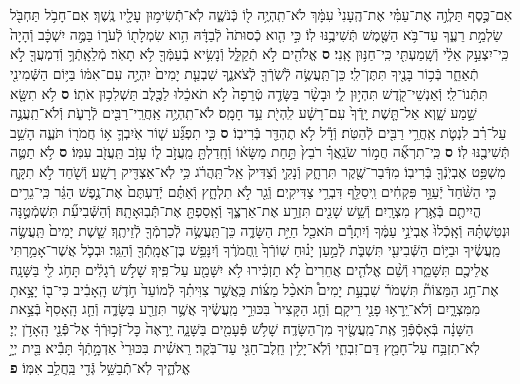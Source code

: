 \documentclass[twoside, openany, parskip=half, 11pt]{book}
\begin{document}
\begin{sometimes}
\begin{footnotesize}
\begin{multicols}{2}
\\
\\
אִם־כֶּ֣סֶף תַּלְוֶ֣ה אֶת־עַמִּ֗י אֶת־הֶֽעָנִי֙ עִמָּ֔ךְ לֹא־תִֽהְיֶ֥ה ל֖וֹ כְּֿנֹשֶׁ֑ה לֹֽא־תְֿֿשִׂימ֥וּן עָלָ֖יו נֶֽשֶׁךְ׃ אִם־חָבֹ֥ל תַּחְבֹּ֖ל שַׂלְמַ֣ת רֵעֶ֑ךָ עַד־בֹּ֥א הַשֶּׁ֖מֶשׁ תְּֿשִׁיבֶ֥נּוּ לֽוֹ׃ כִּ֣י הִ֤וא כְֿסוּתֹה֙ לְֿבַדָּ֔הּ הִ֥וא שִׂמְלָת֖וֹ לְֿעֹר֑וֹ בַּמֶּ֣ה יִשְׁכָּ֔ב וְֿהָיָה֙ כִּֽי־יִצְעַ֣ק אֵלַ֔י וְֿשָֽׁמַעְתִּ֖י כִּֽי־חַנּ֥וּן אָֽנִי׃ \textbf{ס}
אֱלֹהִ֖ים לֹ֣א תְֿקַלֵּ֑ל וְֿנָשִׂ֥יא בְֿעַמְּֿךָ֖ לֹ֥א תָאֹֽר׃ מְֿלֵאָֽתְֿךָ֥ וְֿדִמְעֲךָ֖ לֹ֣א תְֿאַחֵ֑ר בְּֿכ֥וֹר בָּנֶ֖יךָ תִּתֶּן־לִֽי׃ כֵּן־תַּֽעֲשֶׂ֥ה לְֿשֹֽׁרְֿךָ֖ לְֿצֹאנֶ֑ךָ שִׁבְעַ֤ת יָמִים֙ יִהְיֶ֣ה עִם־אִמּ֔וֹ בַּיּ֥וֹם הַשְּֿׁמִינִ֖י תִּתְּֿנוֹ־לִֽי׃ וְֿאַנְשֵׁי־קֹ֖דֶשׁ תִּהְי֣וּן לִ֑י וּבָשָׂ֨ר בַּשָּׂדֶ֤ה טְֿרֵפָה֙ לֹ֣א תֹאכֵ֔לוּ לַכֶּ֖לֶב תַּשְׁלִכ֥וּן אֹתֽוֹ׃ \textbf{ס} לֹ֥א תִשָּׂ֖א שֵׁ֣מַע שָׁ֑וְא אַל־תָּ֤שֶׁת יָֽדְֿךָ֙ עִם־רָשָׁ֔ע לִֽהְיֹ֖ת עֵ֥ד חָמָֽס׃ לֹא־תִֽהְיֶ֥ה אַֽחֲרֵֽי־רַבִּ֖ים לְֿרָעֹ֑ת וְֿלֹא־תַֽעֲנֶ֣ה עַל־רִ֗ב לִנְטֹ֛ת אַֽחֲרֵ֥י רַבִּ֖ים לְֿהַטֹּֽת׃ וְֿדָ֕ל לֹ֥א תֶהְדַּ֖ר בְּֿרִיבֽוֹ׃ \textbf{ס} כִּ֣י תִפְגַּ֞ע שׁ֧וֹר אֹֽיִבְךָ֛ א֥וֹ חֲמֹר֖וֹ תֹּעֶ֑ה הָשֵׁ֥ב תְּֿשִׁיבֶ֖נּוּ לֽוֹ׃ \textbf{ס} כִּֽי־תִרְאֶ֞ה חֲמ֣וֹר שֹׂנַֽאֲךָ֗ רֹבֵץ֙ תַּ֣חַת מַשָּׂא֔וֹ וְֿחָֽדַלְתָּ֖ מֵֽעֲזֹ֣ב ל֑וֹ עָזֹ֥ב תַּֽעֲזֹ֖ב עִמּֽוֹ׃ \textbf{ס}
לֹ֥א תַטֶּ֛ה מִשְׁפַּ֥ט אֶבְיֹֽנְֿךָ֖ בְּֿרִיבֽוֹ׃ מִדְּֿבַר־שֶׁ֖קֶר תִּרְחָ֑ק וְֿנָקִ֤י וְֿצַדִּיק֙ אַֽל־תַּֽהֲרֹ֔ג כִּ֥י לֹֽא־אַצְדִּ֖יק רָשָֽׁע׃ וְֿשֹׁ֖חַד לֹ֣א תִקָּ֑ח כִּ֤י הַשֹּׁ֨חַד֙ יְֿעַוֵּ֣ר פִּקְחִ֔ים וִֽיסַלֵּ֖ף דִּבְרֵ֥י צַדִּיקִֽים׃ וְֿגֵ֖ר לֹ֣א תִלְחָ֑ץ וְֿאַתֶּ֗ם יְֿדַעְתֶּם֙ אֶת־נֶ֣פֶשׁ הַגֵּ֔ר כִּֽי־גֵרִ֥ים הֱיִיתֶ֖ם בְּֿאֶ֥רֶץ מִצְרָֽיִם׃ וְֿשֵׁ֥שׁ שָׁנִ֖ים תִּזְרַ֣ע אֶת־אַרְצֶ֑ךָ וְֿאָֽסַפְתָּ֖ אֶת־תְּֿֿבֽוּאָתָֽהּ׃ וְֿהַשְּֿׁבִיעִ֞ת תִּשְׁמְֿטֶ֣נָּה וּנְטַשְׁתָּ֗הּ וְֿאָֽכְֿלוּ֙ אֶבְיֹנֵ֣י עַמֶּ֔ךָ וְֿיִתְרָ֕ם תֹּאכַ֖ל חַיַּ֣ת הַשָּׂדֶ֑ה כֵּן־תַּֽעֲשֶׂ֥ה לְֿכַרְמְֿךָ֖ לְֿזֵיתֶֽךָ׃ שֵׁ֤שֶׁת יָמִים֙ תַּֽעֲשֶׂ֣ה מַֽעֲשֶׂ֔יךָ וּבַיּ֥וֹם הַשְּֿׁבִיעִ֖י תִּשְׁבֹּ֑ת לְֿמַ֣עַן יָנ֗וּחַ שֽׁוֹרְֿךָ֙ וַֽחֲמֹרֶ֔ךָ וְֿיִנָּפֵ֥שׁ בֶּן־אֲמָֽתְֿךָ֖ וְֿהַגֵּֽר׃ וּבְכֹ֛ל אֲשֶׁר־אָמַ֥רְתִּי אֲלֵיכֶ֖ם תִּשָּׁמֵ֑רוּ וְֿשֵׁ֨ם אֱלֹהִ֤ים אֲחֵרִים֙ לֹ֣א תַזְכִּ֔ירוּ לֹ֥א יִשָּׁמַ֖ע עַל־פִּֽיךָ׃ שָׁלֹ֣שׁ רְֿגָלִ֔ים תָּחֹ֥ג לִ֖י בַּשָּׁנָֽה׃ אֶת־חַ֣ג הַמַּצּוֹת֘ תִּשְׁמֹר֒ שִׁבְעַ֣ת יָמִים֩ תֹּאכַ֨ל מַצּ֜וֹת כַּֽאֲשֶׁ֣ר צִוִּיתִ֗ךָ לְֿמוֹעֵד֙ חֹ֣דֶשׁ הָֽאָבִ֔יב כִּי־ב֖וֹ יָצָ֣אתָ מִמִּצְרָ֑יִם וְֿלֹא־יֵֽרָא֥וּ פָנַ֖י רֵיקָֽם׃ וְֿחַ֤ג הַקָּצִיר֙ בִּכּוּרֵ֣י מַֽעֲשֶׂ֔יךָ אֲשֶׁ֥ר תִּזְרַ֖ע בַּשָּׂדֶ֑ה וְֿחַ֤ג הָֽאָסִף֙ בְּֿצֵ֣את הַשָּׁנָ֔ה בְּֿאָסְֿפְּֿךָ֥ אֶֽת־מַֽעֲשֶׂ֖יךָ מִן־הַשָּׂדֶֽה׃ שָׁלֹ֥שׁ פְּֿעָמִ֖ים בַּשָּׁנָ֑ה יֵֽרָאֶה֙ כׇּל־זְֿכ֣וּרְֿךָ֔ אֶל־פְּֿֿנֵ֖י הָֽאָדֹ֥ן יְיָ׃ לֹֽא־תִזְבַּ֥ח עַל־חָמֵ֖ץ דַּם־זִבְחִ֑י וְֿלֹֽא־יָלִ֥ין חֵֽלֶב־חַגִּ֖י עַד־בֹּֽקֶר׃ רֵאשִׁ֗ית בִּכּוּרֵי֙ אַדְמָ֣תְֿךָ֔ תָּבִ֕יא בֵּ֖ית יְיָ֣ אֱלֹהֶ֑יךָ לֹֽא־תְֿֿבַשֵּׁ֥ל גְּֿדִ֖י בַּֽחֲלֵ֥ב אִמּֽוֹ׃ \textbf{פ}


\end{multicols}
\end{footnotesize}
\end{sometimes}
\end{document}
